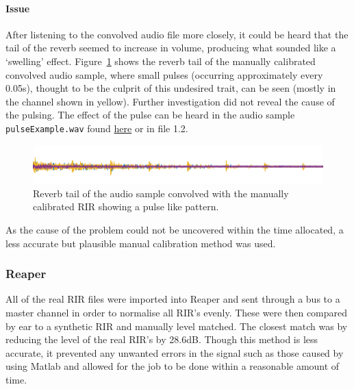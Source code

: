 \documentclass[../../main.tex]{subfiles}
\begin{document}
		\paragraph{Issue}
			After listening to the convolved audio file more closely, it could be heard that the tail of the reverb seemed to increase in volume, producing what sounded like a `swelling' effect. Figure~\ref{pulse} shows the reverb tail of the manually calibrated convolved audio sample, where small pulses (occurring approximately every 0.05s), thought to be the culprit of this undesired trait, can be seen (mostly in the channel shown in yellow). Further investigation did not reveal the cause of the pulsing. The effect of the pulse can be heard in the audio sample \texttt{pulseExample.wav} found \href{http://lt669.github.io/pages/audioSamples.html}{here} or in file 1.2.

			\begin{figure}[p]
				\begin{center}
					\includegraphics[scale = 1]{Sections/Implementation/RealRIRs/images/calibration/cal_pulse.png} 
					\caption{Reverb tail of the audio sample convolved with the manually calibrated \ac{RIR} showing a pulse like pattern.}
					\label{pulse}
				\end{center}
			\end{figure}

			As the cause of the problem could not be uncovered within the time allocated, a less accurate but plausible manual calibration method was used.

		\subsubsection{Reaper}

			All of the real \ac{RIR} files were imported into Reaper and sent through a bus to a master channel in order to normalise all \ac{RIR}'s evenly. These were then compared by ear to a synthetic \ac{RIR} and manually level matched. The closest match was by reducing the level of the real \ac{RIR}'s by 28.6dB. Though this method is less accurate, it prevented any unwanted errors in the signal such as those caused by using Matlab and allowed for the job to be done within a reasonable amount of time.
\end{document}
